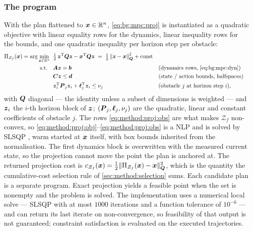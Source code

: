 \subsubsection*{The program}

With the plan flattened to $\boldsymbol{x}\in\mathbb{R}^{n}$, \eqref{eq:bg:mpc:proj} is instantiated as a
quadratic objective with linear equality rows for the dynamics, linear inequality rows for the
bounds, and one quadratic inequality per horizon step per obstacle:
\begin{align}
  \Pi_{\mathcal{Z}_{f}}(\boldsymbol{x})
    = \arg\min_{\boldsymbol{z}\in\mathbb{R}^{n}}\;\; &
       \tfrac{1}{2}\,\boldsymbol{z}^{\textrm{T}}\boldsymbol{Q}\boldsymbol{z} - \boldsymbol{x}^{\textrm{T}}\boldsymbol{Q}\boldsymbol{z}
       \;=\; \tfrac{1}{2}\left\|\boldsymbol{z}-\boldsymbol{x}\right\|_{\boldsymbol{Q}}^{2} + \text{const}
       \label{eq:method:proj:obj}\\
  \text{s.t.}\quad &
       \boldsymbol{A}\boldsymbol{z} = \boldsymbol{b}
       &&\text{(dynamics rows, \eqref{eq:bg:mpc:dyn})}
       \label{eq:method:proj:eq}\\
    & \boldsymbol{C}\boldsymbol{z} \le \boldsymbol{d}
       &&\text{(state / action bounds, halfspaces)}
       \label{eq:method:proj:ineq}\\
    & \boldsymbol{z}_{i}^{\textrm{T}}\boldsymbol{P}_{j}\boldsymbol{z}_{i} + \boldsymbol{\ell}_{j}^{\textrm{T}}\boldsymbol{z}_{i}
       \le \nu_{j}
       &&\text{(obstacle $j$ at horizon step $i$),}
       \label{eq:method:proj:obs}
\end{align}
with $\boldsymbol{Q}$ diagonal --- the identity unless a subset of dimensions is weighted --- and
$\boldsymbol{z}_{i}$ the $i$-th horizon block of $\boldsymbol{z}$; $(\boldsymbol{P}_{j},\boldsymbol{\ell}_{j},\nu_{j})$
are the quadratic, linear and constant coefficients of obstacle $j$. The rows \eqref{eq:method:proj:obs} are
what makes $\mathcal{Z}_{f}$ non-convex, so \eqref{eq:method:proj:obj}--\eqref{eq:method:proj:obs}
is a \ac{NLP} and is solved by SLSQP \parencite{kraft1988software,virtanen2020scipy}, warm
started at $\boldsymbol{x}$ itself, with box bounds inherited from the normalisation. The first
dynamics block is overwritten with the measured current state, so the projection cannot move the
point the plan is anchored at. The returned projection cost is
$c_{\mathcal{Z}_{f}}(\boldsymbol{x}) = \tfrac{1}{2}\|\Pi_{\mathcal{Z}_{f}}(\boldsymbol{x})-\boldsymbol{x}\|_{\boldsymbol{Q}}^{2}$,
which is the quantity the cumulative-cost selection rule of \autoref{sec:method:selection} sums.
Each candidate plan is a separate program. Exact projection yields a feasible point when the set
is nonempty and the problem is solved. The implementation uses a numerical local solve --- \ac{SLSQP} with at most $1000$ iterations and a function
tolerance of $10^{-6}$ --- and can return its last iterate on non-convergence, so feasibility of that output is not guaranteed;
constraint satisfaction is evaluated on the executed trajectories.

